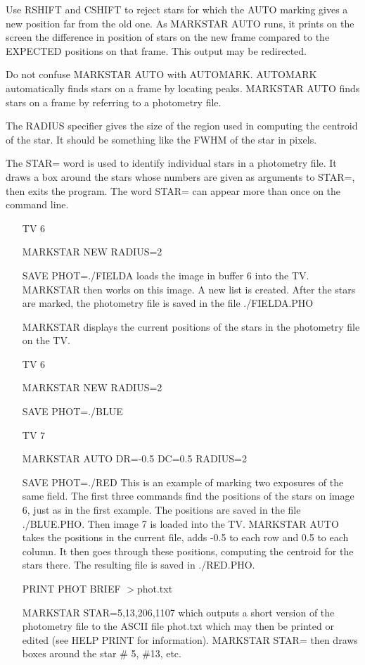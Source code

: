 Use RSHIFT and CSHIFT to reject stars for which the AUTO marking gives a
new position far from the old one.  As MARKSTAR AUTO runs, it prints on the
screen the difference in position of stars on the new frame compared to the
EXPECTED positions on that frame.  This output may be redirected.

Do not confuse MARKSTAR AUTO with AUTOMARK.  AUTOMARK automatically finds
stars on a frame by locating peaks.  MARKSTAR AUTO finds stars on a frame
by referring to a photometry file.

The RADIUS specifier gives the size of the region used in computing the
centroid of the star.  It should be something like the FWHM of the star in
pixels.

The STAR= word is used to identify individual stars in a photometry file.
It draws a box around the stars whose numbers are given as arguments to
STAR=, then exits the program.  The word STAR= can appear more than once on
the command line.

\begin{itemize}
  \item[TV 6\hfill]{}
  \item[MARKSTAR NEW RADIUS=2\hfill]{}
  \item[SAVE PHOT=./FIELDA\hfill]{
loads the image in buffer 6 into the TV.  MARKSTAR
then works on this image.  A new list is created.
After the stars are marked, the photometry file is
saved in the file ./FIELDA.PHO}
  \item[MARKSTAR\hfill]{
displays the current positions of the stars in the
photometry file on the TV.}
  \item[TV 6 \hfill]{}
  \item[MARKSTAR NEW RADIUS=2\hfill]{}
  \item[SAVE PHOT=./BLUE\hfill]{}
  \item[TV 7\hfill]{}
  \item[MARKSTAR AUTO DR=-0.5 DC=0.5 RADIUS=2\hfill]{}
  \item[SAVE PHOT=./RED\hfill]{ This is an example of marking two exposures
       of the same field.  The first three commands find the positions of
       the stars on image 6, just as in the first example.  The positions
       are saved in the file ./BLUE.PHO.  Then image 7 is loaded into the
       TV.  MARKSTAR AUTO takes the positions in the current file, adds
       -0.5 to each row and 0.5 to each column. It then goes through these
       positions, computing the centroid for the stars there.  The
       resulting file is saved in ./RED.PHO.}

  \item[PRINT PHOT BRIEF $>$phot.txt\hfill]{}

  \item[MARKSTAR STAR=5,13,206,1107\hfill]{ which outputs a short version
       of the photometry file to the ASCII file phot.txt which may then be
       printed or edited (see HELP PRINT for information).  MARKSTAR STAR=
       then draws boxes around the star \# 5, \#13, etc.}
\end{itemize}

